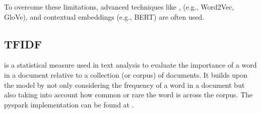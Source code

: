 \documentclass[letterpaper,11pt,english]{sphinxmanual}
\begin{document}
\sphinxAtStartPar
To overcome these limitations, advanced techniques like , 
(e.g., Word2Vec, GloVe), and contextual embeddings (e.g., BERT) are often used.


\subsection{TF\sphinxhyphen{}IDF}
\label{\detokenize{embedding:tf-idf}}
\sphinxAtStartPar
{} is a statistical measure used
in text analysis to evaluate the importance of a word in a document relative to a
collection (or corpus) of documents. It builds upon the  model
by not only considering the frequency of a word in a document but also taking
into account how common or rare the word is across the corpus. The pyspark implementation
can be found at .
\end{document}
